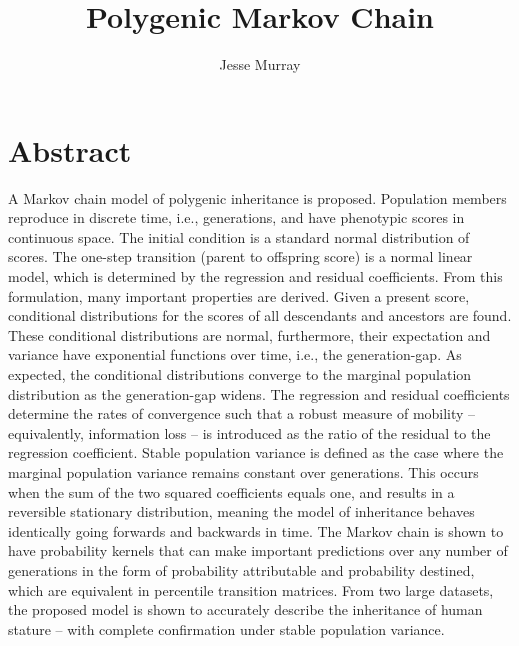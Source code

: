 \documentclass[letterpaper,10pt]{article} %
\title{Polygenic Markov Chain}
\author{Jesse Murray}
\date{}
\begin{document}
\maketitle





\section*{Abstract}
%
A Markov chain model of polygenic inheritance is proposed.
%
Population members reproduce in discrete time, i.e., generations, and have phenotypic scores in continuous space.
%
The initial condition is a standard normal distribution of scores.
%
The one-step transition (parent to offspring score) is a normal linear model, which is determined by the regression and residual coefficients.
%
From this formulation, many important properties are derived. 
%
Given a present score, conditional distributions for the scores of all descendants and ancestors are found. 
%
These conditional distributions are normal, furthermore, their expectation and variance have exponential functions over time, i.e., the generation-gap.
%
As expected, the conditional distributions converge to the marginal population distribution as the generation-gap widens.
%
The regression and residual coefficients determine the rates of convergence such that a robust measure of mobility -- equivalently, information loss -- is introduced as the ratio of the residual to the regression coefficient.
%
Stable population variance is defined as the case where the marginal population variance remains constant over generations.
%
This occurs when the sum of the two squared coefficients equals one, and results in a reversible stationary distribution, meaning the model of inheritance behaves identically going forwards and backwards in time.
%
The Markov chain is shown to have probability kernels that can make important predictions over any number of generations in the form of probability attributable and probability destined, which are equivalent in percentile transition matrices. 
%
From two large datasets, the proposed model is shown to accurately describe the inheritance of human stature -- with complete confirmation under stable population variance.



\newpage

\tableofcontents
\clearpage


\end{document}
